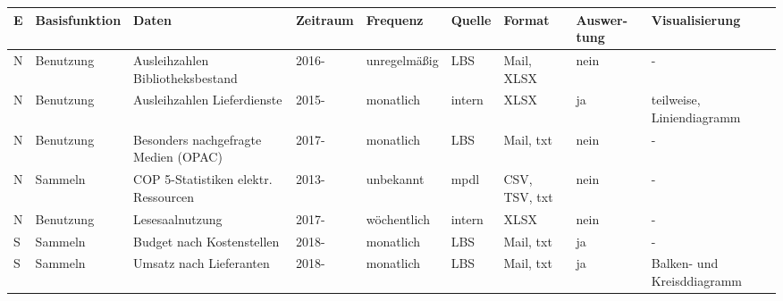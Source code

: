 \begin{table}[H]
    \centering
    \large
    \begin{adjustbox}{max width=\textwidth}
    \begin{tabular}{p{}p{}p{}p{}p{}p{}p{}p{}p{}}
       \toprule
       \textbf{E\footnotemark} &\textbf{Basisfunktion}               &\textbf{Daten}                                 &\textbf{Zeitraum} &\textbf{Frequenz}    &\textbf{Quelle}  &\textbf{Format}          &\textbf{Auswer-tung} & \textbf{Visualisierung}\\
       \midrule     
            N         &Benutzung                      & Ausleihzahlen Bibliotheksbestand              & 2016-             & unregelmäßig         & LBS          & Mail, XLSX\footnotemark                & nein  & -\\
            N         &Benutzung                      & Ausleihzahlen Lieferdienste                   & 2015-             & monatlich         & intern       & XLSX                      & ja    & teilweise, Liniendiagramm\\ 
            N         &Benutzung                      & Besonders nachgefragte Medien (OPAC)          & 2017-             & monatlich         & LBS          & Mail, txt                 & nein  & -\\ 
            N         &Sammeln                       &\acrshort{COP 5}-Statistiken elektr. Ressourcen& 2013-            & unbekannt                 & mpdl         & CSV, TSV, txt             & nein  & -\\ 
            N         &Benutzung                      & Lesesaalnutzung                               & 2017-             & wöchentlich       & intern       & XLSX                      & nein  & -\\ 
            S         &Sammeln                       & Budget nach Kostenstellen                   & 2018-               & monatlich         & LBS          & Mail, txt                 & ja    & -\\ 
            S         &Sammeln                       & Umsatz nach Lieferanten                     & 2018-               & monatlich         & LBS          & Mail, txt                 & ja    & Balken- und Kreisddiagramm\\ 

\end{tabular}
\end{adjustbox}
\end{table}
